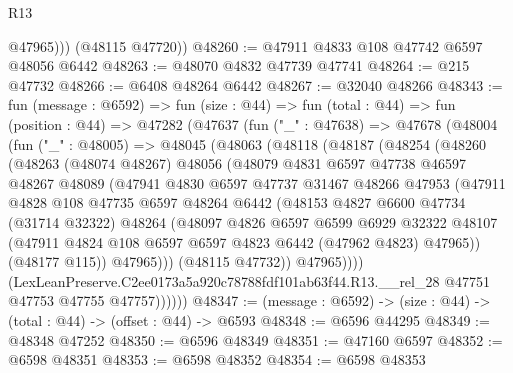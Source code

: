 \begin{lexlean}{R13}
\begin{coremodule}
            @47965)))
      (@48115 @47720))
@48260 := @47911 @4833 @108 @47742 @6597 @48056 @6442
@48263 := @48070 @4832 @47739 @47741
@48264 := @215 @47732
@48266 := @6408 @48264 @6442
@48267 := @32040 @48266
@48343 := fun (message : @6592) =>
  fun (size : @44) =>
  fun (total : @44) =>
  fun (position : @44) =>
  @47282
    (@47637
      (fun ("_" : @47638) =>
      @47678
        (@48004
          (fun ("_" : @48005) =>
          @48045
            (@48063
              (@48118
                (@48187
                  (@48254
                    (@48260
                      (@48263
                        (@48074 @48267)
                        @48056
                        (@48079
                          @4831
                          @6597
                          @47738
                          @46597
                          @48267
                          @48089
                          (@47941
                            @4830
                            @6597
                            @47737
                            @31467
                            @48266
                            @47953
                            (@47911
                              @4828
                              @108
                              @47735
                              @6597
                              @48264
                              @6442
                              (@48153
                                @4827
                                @6600
                                @47734
                                (@31714 @32322)
                                @48264
                                (@48097
                                  @4826
                                  @6597
                                  @6599
                                  @6929
                                  @32322
                                  @48107
                                  (@47911 @4824 @108 @6597 @6597 @4823 @6442 (@47962 @4823) @47965))
                                (@48177 @115))
                              @47965)))
                        (@48115 @47732))
                      @47965))))
              (LexLeanPreserve.C2ee0173a5a920c78788fdf101ab63f44.R13.__rel_28
                @47751
                @47753
                @47755
                @47757))))))
@48347 := (message : @6592) -> (size : @44) -> (total : @44) -> (offset : @44) -> @6593
@48348 := @6596 @44295
@48349 := @48348 @47252
@48350 := @6596 @48349
@48351 := @47160 @6597
@48352 := @6598 @48351
@48353 := @6598 @48352
@48354 := @6598 @48353

\end{coremodule}
\end{lexlean}
